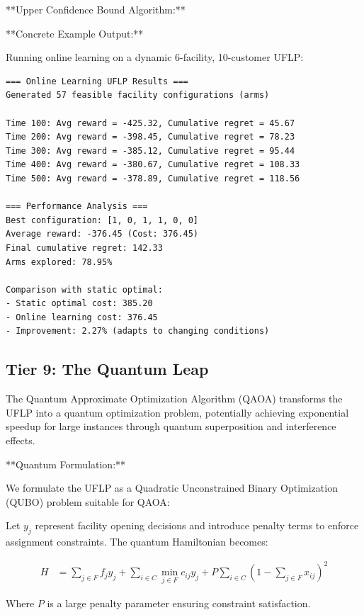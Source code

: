 \documentclass{article}
\begin{document}
**Upper Confidence Bound Algorithm:**



**Concrete Example Output:**

Running online learning on a dynamic 6-facility, 10-customer UFLP:

\begin{verbatim}
=== Online Learning UFLP Results ===
Generated 57 feasible facility configurations (arms)

Time 100: Avg reward = -425.32, Cumulative regret = 45.67
Time 200: Avg reward = -398.45, Cumulative regret = 78.23  
Time 300: Avg reward = -385.12, Cumulative regret = 95.44
Time 400: Avg reward = -380.67, Cumulative regret = 108.33
Time 500: Avg reward = -378.89, Cumulative regret = 118.56

=== Performance Analysis ===
Best configuration: [1, 0, 1, 1, 0, 0]
Average reward: -376.45 (Cost: 376.45)
Final cumulative regret: 142.33
Arms explored: 78.95%

Comparison with static optimal: 
- Static optimal cost: 385.20
- Online learning cost: 376.45  
- Improvement: 2.27% (adapts to changing conditions)
\end{verbatim}

\subsection{Tier 9: The Quantum Leap}

The Quantum Approximate Optimization Algorithm (QAOA) transforms the UFLP into a quantum optimization problem, potentially achieving exponential speedup for large instances through quantum superposition and interference effects.

**Quantum Formulation:**

We formulate the UFLP as a Quadratic Unconstrained Binary Optimization (QUBO) problem suitable for QAOA:

Let $y_j$ represent facility opening decisions and introduce penalty terms to enforce assignment constraints. The quantum Hamiltonian becomes:

\begin{align}
H &= \sum_{j \in F} f_j y_j + \sum_{i \in C} \min_{j \in F} c_{ij} y_j + P \sum_{i \in C} \left(1 - \sum_{j \in F} x_{ij}\right)^2
\end{align}

Where $P$ is a large penalty parameter ensuring constraint satisfaction.
\end{document}
